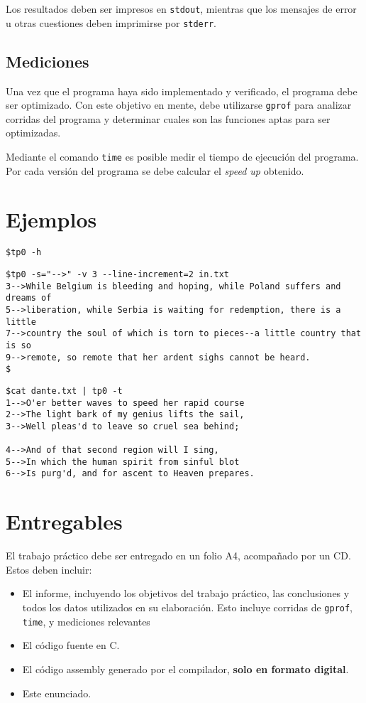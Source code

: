 \documentclass[9pt,a4paper]{article}
\newcommand{\stdout}{\texttt{stdout}}
\newcommand{\stderr}{\texttt{stderr}}
\newcommand{\gprof}{\texttt{gprof}}
\newcommand{\unixtime}{\texttt{time}}
\begin{document}
Los resultados deben ser impresos en \stdout{}, mientras que los mensajes de error u otras cuestiones deben imprimirse por \stderr{}.

\subsection{Mediciones}
Una vez que el programa haya sido implementado y verificado, el programa debe ser optimizado. Con este objetivo en mente, debe
utilizarse \gprof{} para analizar corridas del programa y determinar cuales son las funciones aptas para ser optimizadas.

Mediante el comando \unixtime\cite{TIME} es posible medir el tiempo de ejecución del programa. Por cada versión del programa
se debe calcular el \textit{speed up} obtenido.

\section{Ejemplos}

\begin{verbatim}
$tp0 -h

\end{verbatim}

\begin{verbatim}
$tp0 -s="-->" -v 3 --line-increment=2 in.txt
3-->While Belgium is bleeding and hoping, while Poland suffers and dreams of
5-->liberation, while Serbia is waiting for redemption, there is a little
7-->country the soul of which is torn to pieces--a little country that is so
9-->remote, so remote that her ardent sighs cannot be heard.
$
\end{verbatim}

\begin{verbatim}
$cat dante.txt | tp0 -t
1-->O'er better waves to speed her rapid course
2-->The light bark of my genius lifts the sail,
3-->Well pleas'd to leave so cruel sea behind;

4-->And of that second region will I sing,
5-->In which the human spirit from sinful blot
6-->Is purg'd, and for ascent to Heaven prepares.
\end{verbatim}


\section{Entregables}
El trabajo práctico debe ser entregado en un folio A4, acompañado por un CD. Estos
deben incluir:
\begin{itemize}
\item El informe, incluyendo los objetivos del trabajo práctico, las conclusiones y todos los 
datos utilizados en su elaboración. Esto incluye corridas de \gprof, \unixtime, y mediciones relevantes
\item El código fuente en C.
\item El código assembly generado por el compilador, \textbf{solo en formato digital}.
\item Este enunciado.
\end{itemize}
\end{document}
